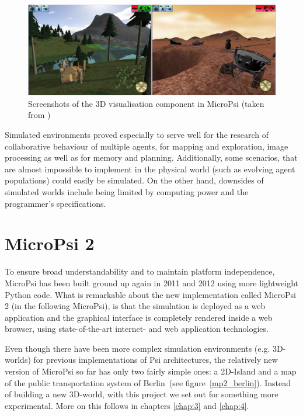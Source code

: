 \begin{figure}[h]
  \centering
    \includegraphics[width=14cm]{graphics/micropsi_3d_screen}
  \caption[Screenshots of the 3D visualisation component in MicroPsi]{Screenshots of the 3D visualisation component in MicroPsi (taken from \cite{Bach:2009:PSI:1611304})}
  \label{micropsi_3d_screen}
\end{figure}

Simulated environments proved especially to serve well for the research of collaborative behaviour of multiple agents, for mapping and exploration, image processing as well as for memory and planning. Additionally, some scenarios, that are almost impossible to implement in the physical world (such as evolving agent populations) could easily be simulated. On the other hand, downsides of simulated worlds include being limited by computing power and the programmer's specifications.~\cite{Bach:2009:PSI:1611304}

    \section{MicroPsi 2}
    \label{sec:2:MicroPsi}
To ensure broad understandability and to maintain platform independence, MicroPsi has been built ground up again in 2011 and 2012 using more lightweight Python code. What is remarkable about the new implementation called MicroPsi 2 (in the following MicroPsi), is that the simulation is deployed as a web application and the graphical interface is completely rendered inside a web browser, using state-of-the-art internet- and web application technologies.~\cite{conf/agi/Bach12}
        
Even though there have been more complex simulation environments (e.g. 3D-worlds) for previous implementations of Psi architectures, the relatively new version of MicroPsi so far has only two fairly simple ones: a 2D-Island and a map of the public transportation system of Berlin~(see figure~\ref{mp2_berlin}). Instead of building a new 3D-world, with this project we set out for something more experimental. More on this follows in chapters \ref{chap:3} and \ref{chap:4}.

